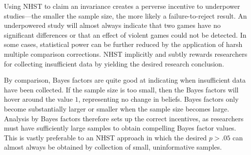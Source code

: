 \documentclass[man]{apa6}
\begin{document}

Using NHST to claim an invariance creates a perverse incentive to underpower studies---the smaller the sample size, the more likely a failure-to-reject result.  An underpowered study will almost always indicate that two games have no significant differences or that an effect of violent games could not be detected. In some cases, statistical power can be further reduced by the application of harsh multiple comparison corrections. NHST implicitly and subtly rewards researchers for collecting insufficient data by yielding the desired research conclusion.

By comparison, Bayes factors are quite good at indicating when insufficient data have been collected. If the sample size is too small, then the Bayes factors will hover around the value $1$, representing no change in beliefs. Bayes factors only become substantially larger or smaller when the sample size becomes large.  Analysis by Bayes factors therefore sets up the correct incentives, as researchers must have sufficiently large samples to obtain compelling Bayes factor values. This is vastly preferable to an NHST approach in which the desired $p > .05$ can almost always be obtained by collection of small, uninformative samples.
\end{document}
